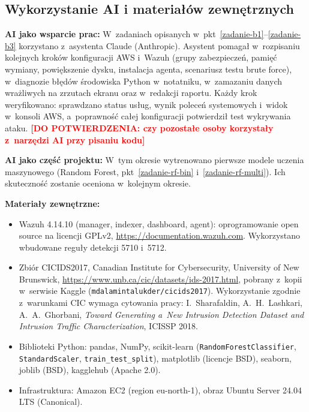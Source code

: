 \documentclass[11pt,a4paper,oneside]{article}
\newif\ifpodpowiedzi
\newcommand{\podpowiedz}[1]{\ifpodpowiedzi\par\begingroup\small\color{hintcolor}\textit{Wskazówka: #1}\par\endgroup\fi}
\newcommand{\dopotw}[1]{\textcolor{red}{\textbf{[DO POTWIERDZENIA: #1]}}}
\begin{document}
\subsection{Wykorzystanie AI i materiałów zewnętrznych}
\podpowiedz{Jeżeli AI miała istotny wpływ na prace z tego okresu, wskaż narzędzie, zadania, zakres zastosowania oraz sposób weryfikacji wyników. Rozróżnij wsparcie prac od rozwijania funkcji AI będących częścią projektu. Nie dołączaj pełnej historii rozmów ani wszystkich promptów. Możesz odwołać się do opisów zadań zamiast powtarzać informacje. Gdy nie korzystano z AI, wpisz tę informację.}
\textbf{AI jako wsparcie prac:} W~zadaniach opisanych w~pkt~\ref{zadanie-b1}--\ref{zadanie-b3} korzystano z~asystenta Claude (Anthropic). Asystent pomagał w~rozpisaniu kolejnych kroków konfiguracji AWS i~Wazuh (grupy zabezpieczeń, pamięć wymiany, powiększenie dysku, instalacja agenta, scenariusz testu brute force), w~diagnozie błędów środowiska Python w~notatniku, w~zamazaniu danych wrażliwych na zrzutach ekranu oraz w~redakcji raportu. Każdy krok weryfikowano: sprawdzano status usług, wynik poleceń systemowych i~widok w~konsoli AWS, a~poprawność całej konfiguracji potwierdził test wykrywania ataku. \dopotw{czy pozostałe osoby korzystały z~narzędzi AI przy pisaniu kodu}\par
\textbf{AI jako część projektu:} W~tym okresie wytrenowano pierwsze modele uczenia maszynowego (Random Forest, pkt~\ref{zadanie-rf-bin} i~\ref{zadanie-rf-multi}). Ich skuteczność zostanie oceniona w~kolejnym okresie.\par
\podpowiedz{Wskaż nowe źródła, biblioteki, modele, dane, zasoby lub cudze fragmenty kodu wykorzystane w tym okresie oraz ich pochodzenie i warunki wykorzystania. W razie potrzeby dodaj wykaz źródeł z odnośnikami.}
\textbf{Materiały zewnętrzne:}
\begin{itemize}
\item Wazuh 4.14.10 (manager, indexer, dashboard, agent): oprogramowanie open source na licencji GPLv2, \url{https://documentation.wazuh.com}. Wykorzystano wbudowane reguły detekcji 5710 i~5712.
\item Zbiór CICIDS2017, Canadian Institute for Cybersecurity, University of New Brunswick, \url{https://www.unb.ca/cic/datasets/ids-2017.html}, pobrany z~kopii w~serwisie Kaggle (\texttt{mdalamintalukder/cicids2017}). Wykorzystanie zgodnie z~warunkami CIC wymaga cytowania pracy: I.~Sharafaldin, A.~H.~Lashkari, A.~A.~Ghorbani, \textit{Toward Generating a~New Intrusion Detection Dataset and Intrusion Traffic Characterization}, ICISSP 2018.
\item Biblioteki Python: pandas, NumPy, scikit-learn (\texttt{RandomForestClassifier}, \texttt{StandardScaler}, \texttt{train\_test\_split}), matplotlib (licencje BSD), seaborn, joblib (BSD), kagglehub (Apache 2.0).
\item Infrastruktura: Amazon EC2 (region eu-north-1), obraz Ubuntu Server 24.04 LTS (Canonical).
\end{itemize}
\end{document}
